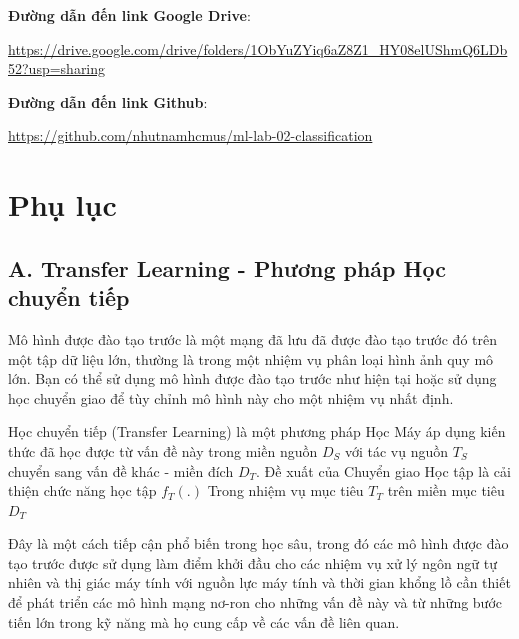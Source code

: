 \documentclass{article}
\begin{document}
	\textbf{Đường dẫn đến link Google Drive}:
	
	 \href{https://drive.google.com/drive/folders/1ObYuZYiq6aZ8Z1_HY08elUShmQ6LDb52?usp=sharing}{https://drive.google.com/drive/folders/1ObYuZYiq6aZ8Z1\_HY08elUShmQ6LDb52?usp=sharing}
	 
	 
	\textbf{Đường dẫn đến link Github}:
	
	\href{https://github.com/nhutnamhcmus/ml-lab-02-classification}{https://github.com/nhutnamhcmus/ml-lab-02-classification}
	
	
	\section{Phụ lục}
	
	\subsection{A. Transfer Learning - Phương pháp Học chuyển tiếp}
	Mô hình được đào tạo trước là một mạng đã lưu đã được đào tạo trước đó trên một tập dữ liệu lớn, thường là trong một nhiệm vụ phân loại hình ảnh quy mô lớn. Bạn có thể sử dụng mô hình được đào tạo trước như hiện tại hoặc sử dụng học chuyển giao để tùy chỉnh mô hình này cho một nhiệm vụ nhất định.
	
	Học chuyển tiếp (Transfer Learning) là một phương pháp Học Máy áp dụng kiến thức đã học được từ vấn đề này trong miền nguồn $ D_{S} $ với tác vụ nguồn $ T_{S}$ chuyển sang vấn đề khác - miền đích $ D_{T} $. Đề xuất của Chuyển giao Học tập là cải thiện chức năng học tập $f_{T}(.)$ Trong nhiệm vụ mục tiêu $ T_{T} $ trên miền mục tiêu $D_{T}$
	
	Đây là một cách tiếp cận phổ biến trong học sâu, trong đó các mô hình được đào tạo trước được sử dụng làm điểm khởi đầu cho các nhiệm vụ xử lý ngôn ngữ tự nhiên và thị giác máy tính với nguồn lực máy tính và thời gian khổng lồ cần thiết để phát triển các mô hình mạng nơ-ron cho những vấn đề này và từ những bước tiến lớn trong kỹ năng mà họ cung cấp về các vấn đề liên quan.
	
\end{document}
